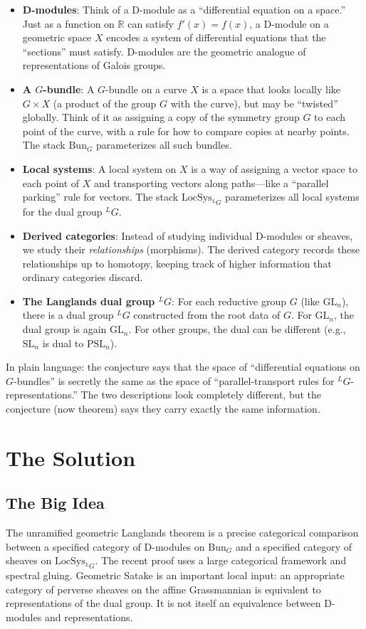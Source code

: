 \begin{itemize}
\item \textbf{D-modules}: Think of a D-module as a ``differential equation on a space.'' Just as a function on $\mathbb{R}$ can satisfy $f'(x) = f(x)$, a D-module on a geometric space $X$ encodes a system of differential equations that the ``sections'' must satisfy. D-modules are the geometric analogue of representations of Galois groups.
\item \textbf{A $G$-bundle}: A $G$-bundle on a curve $X$ is a space that looks locally like $G \times X$ (a product of the group $G$ with the curve), but may be ``twisted'' globally. Think of it as assigning a copy of the symmetry group $G$ to each point of the curve, with a rule for how to compare copies at nearby points. The stack $\mathrm{Bun}_G$ parameterizes all such bundles.
\item \textbf{Local systems}: A local system on $X$ is a way of assigning a vector space to each point of $X$ and transporting vectors along paths---like a ``parallel parking'' rule for vectors. The stack $\mathrm{LocSys}_{^LG}$ parameterizes all local systems for the dual group ${}^LG$.
\item \textbf{Derived categories}: Instead of studying individual D-modules or sheaves, we study their \emph{relationships} (morphisms). The derived category records these relationships up to homotopy, keeping track of higher information that ordinary categories discard.
\item \textbf{The Langlands dual group ${}^LG$}: For each reductive group $G$ (like $\mathrm{GL}_n$), there is a dual group ${}^LG$ constructed from the root data of $G$. For $\mathrm{GL}_n$, the dual group is again $\mathrm{GL}_n$. For other groups, the dual can be different (e.g., $\mathrm{SL}_n$ is dual to $\mathrm{PSL}_n$).
\end{itemize}

In plain language: the conjecture says that the space of ``differential equations on $G$-bundles'' is secretly the same as the space of ``parallel-transport rules for ${}^LG$-representations.'' The two descriptions look completely different, but the conjecture (now theorem) says they carry exactly the same information.

\section{The Solution}

\subsection{The Big Idea}
The unramified geometric Langlands theorem is a precise categorical comparison between a specified category of D-modules on $\mathrm{Bun}_G$ and a specified category of sheaves on $\mathrm{LocSys}_{^LG}$. The recent proof uses a large categorical framework and spectral gluing. Geometric Satake is an important local input: an appropriate category of perverse sheaves on the affine Grassmannian is equivalent to representations of the dual group. It is not itself an equivalence between D-modules and representations.

